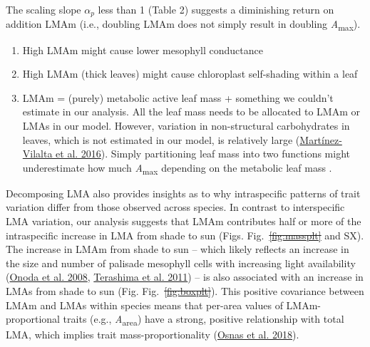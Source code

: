 \documentclass[
  12pt,
  a4paper,
,tablecaptionabove
]{scrartcl}
\providecommand{\tightlist}{%
  \setlength{\itemsep}{0pt}\setlength{\parskip}{0pt}}
\providecommand{\DIFaddtex}[1]{{\protect\color{blue}\uwave{#1}}} %
\providecommand{\DIFdeltex}[1]{{\protect\color{red}\sout{#1}}}                      %
\providecommand{\DIFaddbegin}{} %
\providecommand{\DIFaddend}{} %
\providecommand{\DIFdelbegin}{} %
\providecommand{\DIFdelend}{} %
\providecommand{\DIFadd}[1]{\texorpdfstring{\DIFaddtex{#1}}{#1}} %
\providecommand{\DIFdel}[1]{\texorpdfstring{\DIFdeltex{#1}}{}} %
\newcommand{\DIFscaledelfig}{0.5}
\newlength{\DIFdelgraphicswidth} %
\newlength{\DIFdelgraphicsheight} %
\newcommand{\DIFaddincludegraphics}[2][]{{\color{blue}\fbox{\DIFOincludegraphics[#1]{#2}}}} %
\newcommand{\DIFdelincludegraphics}[2][]{%
\sbox{\DIFdelgraphicsbox}{\DIFOincludegraphics[#1]{#2}}%
\settoboxwidth{\DIFdelgraphicswidth}{\DIFdelgraphicsbox} %
\settoboxtotalheight{\DIFdelgraphicsheight}{\DIFdelgraphicsbox} %
\scalebox{\DIFscaledelfig}{%
\parbox[b]{\DIFdelgraphicswidth}{\usebox{\DIFdelgraphicsbox}\\[-\baselineskip] \rule{\DIFdelgraphicswidth}{0em}}\llap{\resizebox{\DIFdelgraphicswidth}{\DIFdelgraphicsheight}{%
\setlength{\unitlength}{\DIFdelgraphicswidth}%
\begin{picture}(1,1)%
\thicklines\linethickness{2pt} %
{\color[rgb]{1,0,0}\put(0,0){\framebox(1,1){}}}%
{\color[rgb]{1,0,0}\put(0,0){\line( 1,1){1}}}%
{\color[rgb]{1,0,0}\put(0,1){\line(1,-1){1}}}%
\end{picture}%
}\hspace*{3pt}}} %
} %
\DeclareRobustCommand{\DIFaddbegin}{\DIFOaddbegin \let\includegraphics\DIFaddincludegraphics} %
\DeclareRobustCommand{\DIFaddend}{\DIFOaddend \let\includegraphics\DIFOincludegraphics} %
\DeclareRobustCommand{\DIFdelbegin}{\DIFOdelbegin \let\includegraphics\DIFdelincludegraphics} %
\DeclareRobustCommand{\DIFdelend}{\DIFOaddend \let\includegraphics\DIFOincludegraphics} %
\begin{document}
The scaling slope \(\alpha_p\) less than 1 (Table 2) suggests a
diminishing return on addition LMAm (i.e., doubling LMAm does not simply
result in doubling \emph{A}\textsubscript{max}).

\begin{enumerate}
\def\labelenumi{\arabic{enumi}.}
\tightlist
\item
  High LMAm might cause lower mesophyll conductance
\item
  High LMAm (thick leaves) might cause chloroplast self-shading within a
  leaf
\item
  LMAm = (purely) metabolic active leaf mass + something we couldn't
  estimate in our analysis. All the leaf mass needs to be allocated to
  LMAm or LMAs in our model. However, variation in non-structural
  carbohydrates in leaves, which is not estimated in our model, is
  relatively large
  (\protect\hyperlink{ref-Martinez-Vilalta2016}{Martínez-Vilalta et al.
  2016}). Simply partitioning leaf mass into two functions might
  underestimate how much \emph{A}\textsubscript{max} depending on the
  metabolic leaf mass .
\end{enumerate}

Decomposing LMA also provides insights as to why intraspecific patterns
of trait variation differ from those observed across species. In
contrast to interspecific LMA variation, our analysis suggests that LMAm
contributes half or more of the intraspecific increase in LMA from shade
to sun (Figs. Fig.~\DIFdelbegin \DIFdel{\ref{fig:massplt} }\DIFdelend \DIFaddbegin \DIFadd{\ref{fig-massplt} }\DIFaddend and SX). The increase in LMAm from
shade to sun -- which likely reflects an increase in the size and number
of palisade mesophyll cells with increasing light availability
(\protect\hyperlink{ref-Onoda2008}{Onoda et al. 2008},
\protect\hyperlink{ref-Terashima2011}{Terashima et al. 2011}) -- is also
associated with an increase in LMAs from shade to sun (Fig.
Fig.~\DIFdelbegin \DIFdel{\ref{fig:boxplt}}\DIFdelend \DIFaddbegin \DIFadd{\ref{fig-boxplt}}\DIFaddend ). This positive covariance between LMAm and LMAs
within species means that per-area values of LMAm-proportional traits
(e.g., \emph{A}\textsubscript{area}) have a strong, positive
relationship with total LMA, which implies trait mass-proportionality
(\protect\hyperlink{ref-Osnas2018}{Osnas et al. 2018}).
\end{document}
